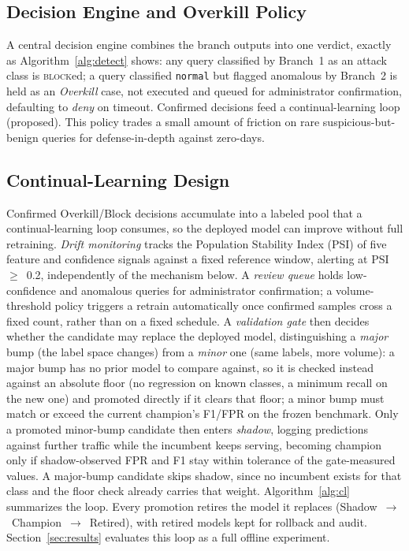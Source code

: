 \documentclass[conference]{IEEEtran}
\begin{document}
\subsection{Decision Engine and Overkill Policy}
A central decision engine combines the branch outputs into one verdict, exactly as Algorithm~\ref{alg:detect} shows: any query classified by Branch~1 as an attack class is \textsc{block}ed; a query classified \texttt{normal} but flagged anomalous by Branch~2 is held as an \emph{Overkill} case, not executed and queued for administrator confirmation, defaulting to \emph{deny} on timeout. Confirmed decisions feed a continual-learning loop (proposed). This policy trades a small amount of friction on rare suspicious-but-benign queries for defense-in-depth against zero-days.

\subsection{Continual-Learning Design}
Confirmed Overkill/Block decisions accumulate into a labeled pool that a continual-learning loop consumes, so the deployed model can improve without full retraining. \emph{Drift monitoring} tracks the Population Stability Index (PSI) of five feature and confidence signals against a fixed reference window, alerting at PSI~$\geq$~0.2, independently of the mechanism below. A \emph{review queue} holds low-confidence and anomalous queries for administrator confirmation; a volume-threshold policy triggers a retrain automatically once confirmed samples cross a fixed count, rather than on a fixed schedule. A \emph{validation gate} then decides whether the candidate may replace the deployed model, distinguishing a \emph{major} bump (the label space changes) from a \emph{minor} one (same labels, more volume): a major bump has no prior model to compare against, so it is checked instead against an absolute floor (no regression on known classes, a minimum recall on the new one) and promoted directly if it clears that floor; a minor bump must match or exceed the current champion's F1/FPR on the frozen benchmark. Only a promoted minor-bump candidate then enters \emph{shadow}, logging predictions against further traffic while the incumbent keeps serving, becoming champion only if shadow-observed FPR and F1 stay within tolerance of the gate-measured values. A major-bump candidate skips shadow, since no incumbent exists for that class and the floor check already carries that weight. Algorithm~\ref{alg:cl} summarizes the loop. Every promotion retires the model it replaces (Shadow~$\rightarrow$~Champion~$\rightarrow$~Retired), with retired models kept for rollback and audit. Section~\ref{sec:results} evaluates this loop as a full offline experiment.
\end{document}
